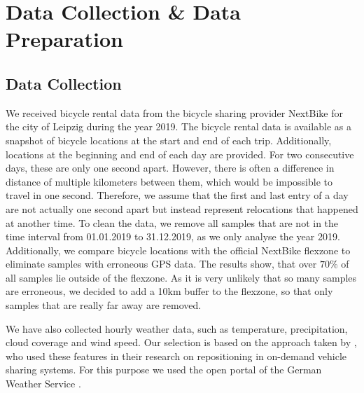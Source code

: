 \section{Data Collection \& Data Preparation}
\label{sec:data_collection_and_data_preparation}


\subsection{Data Collection}
We received bicycle rental data from the bicycle sharing provider NextBike for the city of Leipzig during the year 2019.
% 
The bicycle rental data is available as a snapshot of bicycle locations at the start and end of each trip. Additionally, locations at the beginning and end of each day are provided. For two consecutive days, these are only one second apart. However, there is often a difference in distance of multiple kilometers between them, which would be impossible to travel in one second.
Therefore, we assume that the first and last entry of a day are not actually one second apart but instead represent relocations that happened at another time. To clean the data, we remove all samples that are not in the time interval from 01.01.2019 to 31.12.2019, as we only analyse the year 2019. Additionally, we compare bicycle locations with the official NextBike flexzone to eliminate samples with erroneous GPS data. The results show, that over \(70\%\) of all samples lie outside of the flexzone. As it is very unlikely that so many samples are erroneous, we decided to add a 10km buffer to the flexzone, so that only samples that are really far away are removed.

We have also collected hourly weather data, such as temperature, precipitation, cloud coverage and wind speed. Our selection is based on the approach taken by , who used these features in their research on repositioning in on-demand vehicle sharing systems. For this purpose we used the open portal of the German Weather Service . 

